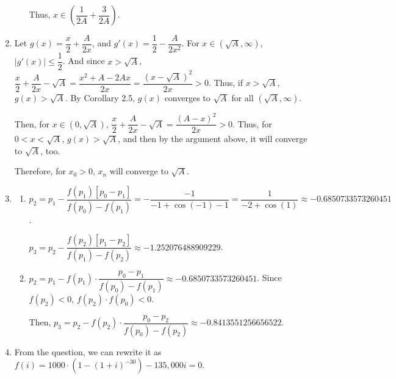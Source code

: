 \documentclass[12pt]{article}
\begin{document}
\begin{enumerate}
\begin{enumerate}
        Thus, $x\in \left( \dfrac{1}{2A} + \dfrac{3}{2A}\right)$.
    \end{enumerate}

    \item Let $g(x) = \dfrac{x}{2} + \dfrac{A}{2x}$, and $g'(x) = \dfrac{1}{2} - \dfrac{A}{2x^2}$.
    For $x \in (\sqrt{A}, \infty)$, $|g'(x)| \leq \dfrac{1}{2}$.
    And since $x > \sqrt{A}$, $\dfrac{x}{2} + \dfrac{A}{2x} - \sqrt{A} = \dfrac{x^2 + A -2Ax}{2x} = \dfrac{(x-\sqrt{A})^2}{2x} > 0$.
    Thus, if $x>\sqrt{A}$, $g(x) > \sqrt{A}$.
    By Corollary 2.5, $g(x)$ converges to $\sqrt{A}$ for all $(\sqrt{A}, \infty)$.

    Then, for $x\in (0, \sqrt{A})$, $\dfrac{x}{2}+\dfrac{A}{2x} - \sqrt{A} = \dfrac{(A-x)^2}{2x} > 0$.
    Thus, for $0 < x < \sqrt{A}$, $g(x) > \sqrt{A}$, and then by the argument above, it will converge to $\sqrt{A}$, too.

    Therefore, for $x_0 > 0$, $x_n$ will converge to $\sqrt{A}$.

    \item \begin{enumerate}
        \item $p_2 = p_1 - \dfrac{f(p_1)[p_0-p_1]}{f(p_0) - f(p_1)} = -\dfrac{-1}{-1+\cos(-1)-1} = \dfrac{1}{-2+\cos(1)}\approx -0.6850733573260451$.
        
        $p_3 = p_2 - \dfrac{f(p_2)[p_1 - p_2]}{f(p_1) - f(p_2)} \approx -1.252076488909229$.

        \item $p_2 = p_1 - f(p_1)\cdot \dfrac{p_0 - p_1}{f(p_0) - f(p_1)} \approx -0.6850733573260451$.
        Since $f(p_2)< 0$, $f(p_2)\cdot f(p_0)<0$.

        Then, $p_3 = p_2 - f(p_2)\cdot \dfrac{p_0 - p_2}{f(p_0) - f(p_2)} \approx -0.8413551256656522$.
    \end{enumerate}

    \item From the question, we can rewrite it as $f(i) = 1000\cdot (1 - (1+i)^{-30}) - 135,000i = 0$.
\end{enumerate}
\end{document}
